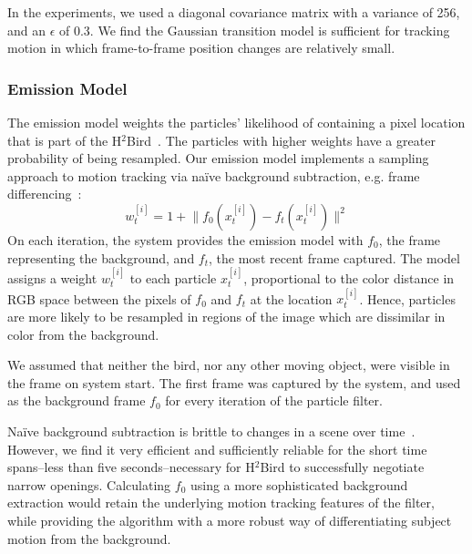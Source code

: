 \documentclass{aamas2013}
\providecommand{\norm}[1]{\lVert#1\rVert}
\begin{document}
In the experiments, we used a diagonal covariance matrix 
with a variance of 256, and an $\epsilon$ of 0.3. We find the Gaussian 
transition model is sufficient for tracking motion in which frame-to-frame 
position changes are relatively small.

\subsubsection{Emission Model}
The emission model weights the particles' likelihood of containing a pixel
location that is part of the H$^2$Bird~\cite{Doucet2001}. The particles with
higher weights have a greater probability of being resampled. Our emission
model implements a sampling approach to motion tracking via na\"{i}ve
background subtraction, e.g. frame differencing~\cite{Ahad2011Computer}:
\begin{equation}
\label{eq:emission_model}
w^{[i]}_t = 1 + \norm{f_0(x^{[i]}_t)-f_t(x^{[i]}_t)}^2
\end{equation} 
On each iteration, the system provides the emission 
model with $f_0$, the frame representing the background, and $f_t$, the most 
recent frame captured. The model assigns a weight $w^{[i]}_t$ to each 
particle $x^{[i]}_t$, proportional to the color distance in RGB space 
between the pixels of $f_0$ and $f_t$ at the location $x^{[i]}_t$.
Hence, particles are more likely to be resampled in regions of 
the image which are dissimilar in color from the background.

We assumed that neither the 
bird, nor any other moving object, were visible in the frame on system 
start. The first frame was captured by the system, and used as 
the background frame $f_0$ for every iteration of the particle filter.

Na\"{i}ve background subtraction is brittle to changes in a scene over 
time~\cite{Ahad2011Computer}. However, we find it very efficient and sufficiently 
reliable for the short time spans--less than five seconds--necessary for 
H$^2$Bird to successfully negotiate narrow openings. Calculating $f_0$ 
using a more sophisticated background extraction would retain the 
underlying motion tracking features of the filter, while providing the 
algorithm with a more robust way of differentiating subject motion from the 
background.

\end{document}
